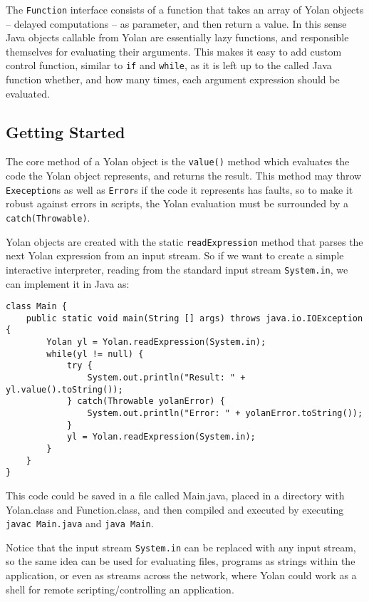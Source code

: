 \documentclass[11pt]{report}
\begin{document}
The \verb|Function| interface consists of a function that takes an array of Yolan objects -- delayed computations -- as parameter, and then return a value. In this sense Java objects callable from Yolan are essentially lazy functions, and responsible themselves for evaluating their arguments. This makes it easy to add custom control function, similar to \verb|if| and \verb|while|, as it is left up to the called Java function whether, and how many times, each argument expression should be evaluated.

\subsection{Getting Started}
The core method of a Yolan object is the \verb|value()| method which evaluates the code the Yolan object represents, and returns the result. This method may throw \verb|Exeception|s as well as \verb|Error|s if the code it represents has faults, so to make it robust against errors in scripts, the Yolan evaluation must be surrounded by a \verb|catch(Throwable)|.

Yolan objects are created with the static \verb|readExpression| method that parses the next Yolan expression from an input stream. So if we want to create a simple interactive interpreter, reading from the standard input stream \verb|System.in|, we can implement it in Java as: \begin{lstlisting}
class Main {
    public static void main(String [] args) throws java.io.IOException {
        Yolan yl = Yolan.readExpression(System.in);
        while(yl != null) {
            try {
                System.out.println("Result: " + yl.value().toString());
            } catch(Throwable yolanError) {
                System.out.println("Error: " + yolanError.toString());
            }
            yl = Yolan.readExpression(System.in);
        }
    }
}\end{lstlisting} 

This code could be saved in a file called Main.java, placed in a directory with Yolan.class and Function.class, and then compiled and executed by executing \verb|javac Main.java| and \verb|java Main|.

Notice that the input stream \verb|System.in| can be replaced with any input stream, so the same idea can be used for evaluating files, programs as strings within the application, or even as streams across the network, where Yolan could work as a shell for remote scripting/controlling an application.
\end{document}
